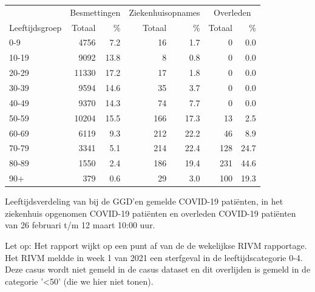 \documentclass[
  english,
  man,floatsintext]{apa6}
\begin{document}
\begin{table}
\centering\begingroup\fontsize{11}{13}\selectfont

\begin{threeparttable}
\begin{tabular}{lrrrrrr}
\toprule
\multicolumn{1}{c}{ } & \multicolumn{2}{c}{Besmettingen} & \multicolumn{2}{c}{Ziekenhuisopnames} & \multicolumn{2}{c}{Overleden} \\
\cmidrule(l{3pt}r{3pt}){2-3} \cmidrule(l{3pt}r{3pt}){4-5} \cmidrule(l{3pt}r{3pt}){6-7}
Leeftijdsgroep & Totaal & \% & Totaal & \% & Totaal & \%\\
\midrule
0-9 & 4756 & 7.2 & 16 & 1.7 & 0 & 0.0\\
10-19 & 9092 & 13.8 & 8 & 0.8 & 0 & 0.0\\
20-29 & 11330 & 17.2 & 17 & 1.8 & 0 & 0.0\\
30-39 & 9594 & 14.6 & 35 & 3.7 & 0 & 0.0\\
40-49 & 9370 & 14.3 & 74 & 7.7 & 0 & 0.0\\
50-59 & 10204 & 15.5 & 166 & 17.3 & 13 & 2.5\\
60-69 & 6119 & 9.3 & 212 & 22.2 & 46 & 8.9\\
70-79 & 3341 & 5.1 & 214 & 22.4 & 128 & 24.7\\
80-89 & 1550 & 2.4 & 186 & 19.4 & 231 & 44.6\\
90+ & 379 & 0.6 & 29 & 3.0 & 100 & 19.3\\
\bottomrule
\end{tabular}
\begin{tablenotes}
\item[1] Leeftijdsverdeling van bij de GGD’en gemelde COVID-19 patiënten, in het ziekenhuis opgenomen COVID-19 patiënten en overleden COVID-19 patiënten van 26 februari t/m 12 maart 10:00 uur.
\item[2] Let op: Het rapport wijkt op een punt af van de de wekelijkse RIVM rapportage. Het RIVM meldde in week 1 van 2021 een sterfgeval in de leeftijdscategorie 0-4. Deze casus wordt niet gemeld in de casus dataset en dit overlijden is gemeld in de categorie '<50' (die we hier niet tonen).
\end{tablenotes}
\end{threeparttable}
\endgroup{}
\end{table}

\newpage
\end{document}

